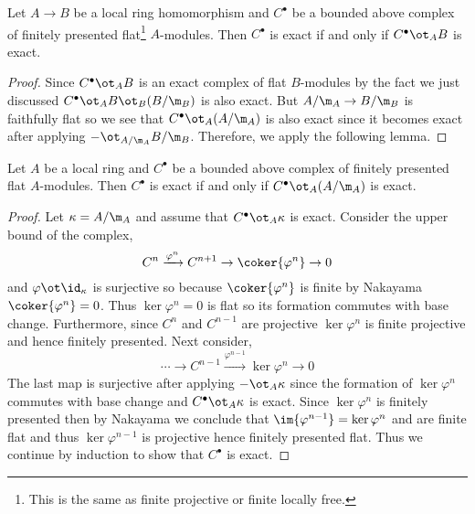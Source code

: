 \documentclass[12pt]{article}
\begin{document}
\begin{lemma}
Let $A \to B$ be a local ring homomorphism and $C^\bullet$ be a bounded above complex of finitely presented flat\footnote{This is the same as finite projective or finite locally free.} $A$-modules. Then $C^\bullet$ is exact if and only if $C^\bullet \ot_A B$ is exact. 
\end{lemma}

\begin{proof}
Since $C^\bullet \ot_A B$ is an exact complex of flat $B$-modules by the fact we just discussed $C^\bullet \ot_A B \ot_B (B / \m_B)$ is also exact. But $A/\m_A \to B/\m_B$ is faithfully flat so we see that $C^\bullet \ot_A (A /\m_A)$ is also exact since it becomes exact after applying $- \ot_{A/\m_A} B / \m_B$. Therefore, we apply the following lemma.
\end{proof}

\begin{lemma}
Let $A$ be a local ring and $C^\bullet$ be a bounded above complex of finitely presented flat $A$-modules. Then $C^\bullet$ is exact if and only if $C^\bullet \ot_A (A/\m_A)$ is exact. 
\end{lemma}

\begin{proof}
Let $\kappa = A / \m_A$ and assume that $C^\bullet \ot_A \kappa$ is exact.
Consider the upper bound of the complex,
\[ C^n \xrightarrow{\varphi^n} C^{n+1} \to \coker{\varphi^n} \to 0 \]
and $\varphi \ot \id_\kappa$ is surjective so because $\coker{\varphi^n}$ is finite by Nakayama $\coker{\varphi^n} = 0$. Thus $\ker{\varphi^n} = 0$ is flat so its formation commutes with base change. Furthermore, since $C^n$ and $C^{n-1}$ are projective $\ker{\varphi^n}$ is finite projective and hence finitely presented. Next consider,
\[ \cdots \to C^{n-1} \xrightarrow{\varphi^{n-1}} \ker{\varphi^n} \to 0 \]
The last map is surjective after applying $- \ot_A \kappa$ since the formation of $\ker{\varphi^n}$ commutes with base change and $C^\bullet \ot_A \kappa$ is exact. Since $\ker{\varphi^n}$ is finitely presented then by Nakayama we conclude that $\im{\varphi^{n-1}} = \ker{\varphi^n}$ and are finite flat and thus $\ker{\varphi^{n-1}}$ is projective hence finitely presented flat. Thus we continue by induction to show that $C^\bullet$ is exact.
\end{proof}
\end{document}
